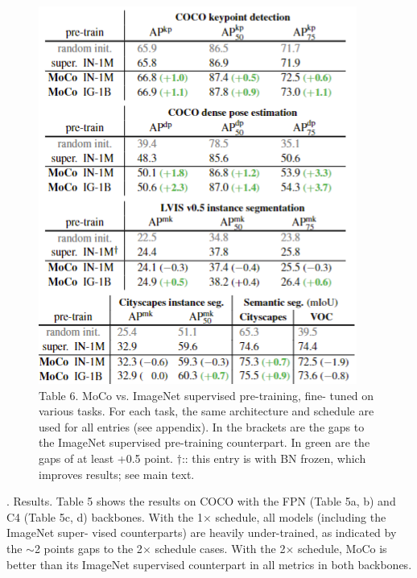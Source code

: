 \documentclass[10pt,twocolumn]{article}  %
\begin{document}
\FloatBarrier
\begin{figure}[h!]
    \centering
    \includegraphics[width=1\linewidth]{Pic/table6.png} %
    \captionsetup{labelformat=empty}
    \caption{Table 6. MoCo vs. ImageNet supervised pre-training, ﬁne-
    tuned on various tasks. For each task, the same architecture and
    schedule are used for all entries (see appendix). In the brackets are
    the gaps to the ImageNet supervised pre-training counterpart. In
    green are the gaps of at least +0.5 point.
    $\dagger$:: this entry is with BN frozen, which improves results; see main text.} %
    \label{fig:Table 6} %
\end{figure}

\cite{22_girshick2018detectron}.
Results. Table 5 shows the results on COCO with the FPN
(Table 5a, b) and C4 (Table 5c, d) backbones. With the
1$\times $ schedule, all models (including the ImageNet super-
vised counterparts) are heavily under-trained, as indicated
by the $\sim $2 points gaps to the 2$\times $ schedule cases. With the
2$\times $ schedule, MoCo is better than its ImageNet supervised
counterpart in all metrics in both backbones.
\end{document}
